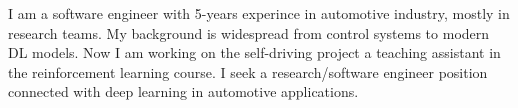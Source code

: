 I am a software engineer with 5-years experince in automotive industry, mostly in research teams. My background is widespread from control systems to modern DL models. Now I am working on the self-driving project a teaching assistant in the reinforcement learning course. I seek a research/software engineer position connected with deep learning in automotive applications.
